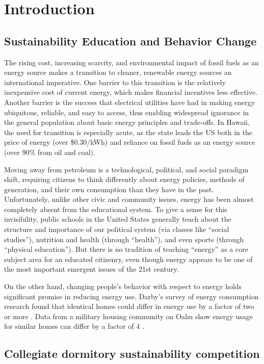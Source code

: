 \chapter{Introduction}

\section{Sustainability Education and Behavior Change}
The rising cost, increasing scarcity, and environmental impact of fossil fuels
as an energy source makes a transition to cleaner, renewable energy sources an
international imperative.  One barrier to this transition is the relatively
inexpensive cost of current energy, which makes financial incentives less
effective. Another barrier is the success that electrical utilities have had in
making energy ubiquitous, reliable, and easy to access, thus enabling
widespread ignorance in the general population about basic energy principles
and trade-offs.  In Hawaii, the need for transition is especially acute, as the
state leads the US both in the price of energy (over \$0.30/kWh) and
reliance on fossil fuels as an energy source (over 90\% from oil and coal).

Moving away from petroleum is a technological, political, and social paradigm
shift, requiring citizens to think differently about energy policies, methods
of generation, and their own consumption than they have in the past.
Unfortunately, unlike other civic and community issues, energy has been almost
completely absent from the educational system. To give a sense for this
invisibility, public schools in the United States generally teach about the
structure and importance of our political system (via classes like ``social
studies''), nutrition and health (through ``health''), and even sports (through
``physical education'').  But there is no tradition of teaching ``energy'' as a
core subject area for an educated citizenry, even though energy appears to be
one of the most important emergent issues of the 21st century.

On the other hand, changing people's behavior with respect to energy holds significant promise in reducing energy use. Darby's survey of energy consumption research found that identical homes could differ in energy use by a factor of two or more \cite{darby-review-2006}. Data from a military housing community on Oahu show energy usage for similar homes can differ by a factor of 4 \cite{Norton2010ZeroEnergyHomes}.

\section{Collegiate dormitory sustainability competition}

